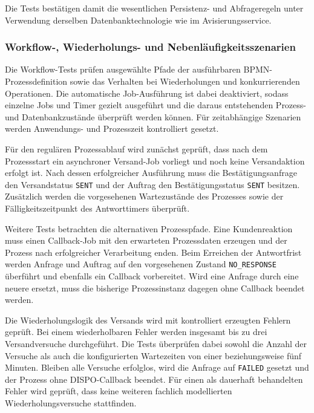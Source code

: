 \documentclass[
  12pt,
  a4paper,
  oneside
]{article}
\begin{document}
Die Tests bestätigen damit die wesentlichen Persistenz- und Abfrageregeln unter
Verwendung derselben Datenbanktechnologie wie im Avisierungsservice.

\subsubsection{Workflow-, Wiederholungs- und Nebenläufigkeitsszenarien}
\label{sec:test-workflow-wiederholung-nebenlaeufigkeit}

Die Workflow-Tests prüfen ausgewählte Pfade der ausführbaren
BPMN-Prozessdefinition sowie das Verhalten bei Wiederholungen und
konkurrierenden Operationen. Die automatische Job-Ausführung ist dabei
deaktiviert, sodass einzelne Jobs und Timer gezielt ausgeführt und die daraus
entstehenden Prozess- und Datenbankzustände überprüft werden können. Für
zeitabhängige Szenarien werden Anwendungs- und Prozesszeit kontrolliert gesetzt.

Für den regulären Prozessablauf wird zunächst geprüft, dass nach dem
Prozessstart ein asynchroner Versand-Job vorliegt und noch keine Versandaktion
erfolgt ist. Nach dessen erfolgreicher Ausführung muss die
Bestätigungsanfrage den Versandstatus \texttt{SENT} und der Auftrag den
Bestätigungsstatus \texttt{SENT} besitzen. Zusätzlich werden die vorgesehenen
Wartezustände des Prozesses sowie der Fälligkeitszeitpunkt des Antworttimers
überprüft.

Weitere Tests betrachten die alternativen Prozesspfade. Eine Kundenreaktion
muss einen Callback-Job mit den erwarteten Prozessdaten erzeugen und der Prozess
nach erfolgreicher Verarbeitung enden. Beim Erreichen der Antwortfrist werden
Anfrage und Auftrag auf den vorgesehenen Zustand \texttt{NO\_RESPONSE}
überführt und ebenfalls ein Callback vorbereitet. Wird eine Anfrage durch eine
neuere ersetzt, muss die bisherige Prozessinstanz dagegen ohne Callback beendet
werden.

Die Wiederholungslogik des Versands wird mit kontrolliert erzeugten Fehlern
geprüft. Bei einem wiederholbaren Fehler werden insgesamt bis zu drei
Versandversuche durchgeführt. Die Tests überprüfen dabei sowohl die Anzahl der
Versuche als auch die konfigurierten Wartezeiten von einer beziehungsweise fünf
Minuten. Bleiben alle Versuche erfolglos, wird die Anfrage auf \texttt{FAILED}
gesetzt und der Prozess ohne DISPO-Callback beendet. Für einen als dauerhaft
behandelten Fehler wird geprüft, dass keine weiteren fachlich modellierten
Wiederholungsversuche stattfinden.
\end{document}
